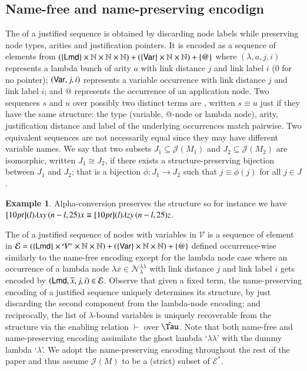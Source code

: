 \documentclass{elsarticle}
\theoremstyle{plain}
\theoremstyle{definition}
\newtheorem{example}{Example}[section]
\newcommand\VarSet{\mathcal{V}}
\newcommand\Nodes{\mathcal{N}}%
\newcommand\NodesLmd{\Nodes_\lambda}%
\newcommand{\ghostlmd}{{\lambda\!\!\lambda}}
\newcommand\ExtendedNodesLmd{\NodesLmd^\ghostlmd}
\def\nameencoding{\mathcal{E}} %
\newcommand{\enables}{\vdash} %
\newcommand{\exttree}{\tilde{\Tau}} %
\def\justseqset{\mathcal{J}}
\begin{document}
\subsection{Name-free and name-preserving encodign}
The  of a justified sequence is obtained by discarding node labels while preserving node types, arities and justification pointers. It is encoded as a sequence of elements from
$(\{\sf Lmd\}\times\mathbb{N}\times\mathbb{N}\times\mathbb{N}) +
   (\{\sf Var\}\times\mathbb{N}\times\mathbb{N})
   + \{ @ \}$
where $(\lambda, a, j, i)$ represents a lambda bunch of arity $a$
with link distance $j$ and link label $i$ ($0$ for no pointer);
$({\sf Var}, j, i)$ represents a variable occurrence
with link distance $j$ and link label $i$;
and $@$ represents the occurrence of an application node.
%
Two sequences $s$ and $u$ over possibly two distinct terms are , written $s \equiv u$ just if they have the same structure: the type (variable, @-node or lambda node), arity, justification distance and label of the underlying occurrences match pairwise. Two equivalent sequences are not necessarily equal since they may have different variable names.
We say that two subsets $J_1\subseteq \justseqset(M_1)$ and $J_2\subseteq\justseqset(M_2)$ are isomorphic, written $J_1\cong J_2$, if  there exists a structure-preserving bijection between $J_1$ and $J_2$; that is a bijection $\phi :J_1\longrightarrow J_2$ such that $j\equiv\phi(j)$ for all $j\in J$.

\begin{example}
    Alpha-conversion preserves the structure so for instance we have
    $\Pstr[10pt]{ (l){\lambda x y} \, (n-l,25){x} } \equiv \Pstr[10pt]{ (l){\lambda z y} \, (n-l,25){z}}$.
\end{example}


The  of a justified sequence of nodes with variables in $\VarSet$ is a sequence of element in
$\nameencoding = (\{\sf Lmd\}\times\mathcal{V}^*\times\nat\times\nat) +
   (\{\sf Var\}\times\nat\times\nat)
   + \{ @ \}$  defined occurrence-wise similarly to the name-free encoding
 except for the lambda node case where
  an occurrence of a lambda node $\lambda\overline{x}\in\ExtendedNodesLmd$
 with link distance $j$ and link label $i$ gets encoded
 by $({\sf Lmd},\overline{x},j,i) \in \mathcal{E}$.
%
Observe that given a fixed term, the name-preserving encoding of a justified sequence uniquely determines its structure, by just discarding the second component from the lambda-node encoding; and reciprocally, the list of $\lambda$-bound variables is uniquely recoverable from the structure via the enabling relation $\enables$ over $\exttree$.
%
Note that both name-free and name-preserving encoding assimilate the ghost lambda `$\ghostlmd$' with the dummy lambda `$\lambda$'.
%
We adopt the name-preserving encoding throughout the rest of the paper and thus assume $\justseqset(M)$ to be a (strict) subset of $\nameencoding^*$.
\end{document}
